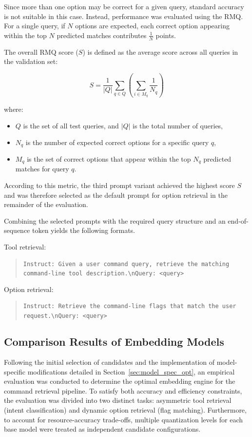 Since more than one option may be correct for a given query, standard accuracy is not suitable in this case. Instead, performance was evaluated using the \ac{RMQ}. For a single query, if $N$ options are expected, each correct option appearing within the top $N$ predicted matches contributes $\frac{1}{N}$ points.

The overall \ac{RMQ} score ($S$) is defined as the average score across all queries in the validation set:

$$S = \frac{1}{|Q|} \sum_{q \in Q} \left( \sum_{i \in M_q} \frac{1}{N_q} \right)$$

where:
\begin{itemize}
    \item $Q$ is the set of all test queries, and $|Q|$ is the total number of queries,
    \item $N_q$ is the number of expected correct options for a specific query $q$,
    \item $M_q$ is the set of correct options that appear within the top $N_q$ predicted matches for query $q$.
\end{itemize}

According to this metric, the third prompt variant achieved the highest score $S$ and was therefore selected as the default prompt for option retrieval in the remainder of the evaluation.

Combining the selected prompts with the required query structure and an end-of-sequence token yields the following formats.

Tool retrieval:

\begin{quote}
\texttt{Instruct: Given a user command query, retrieve the matching command-line tool description.\textbackslash nQuery: <query>}
\end{quote}

Option retrieval:

\begin{quote}
\texttt{Instruct: Retrieve the command-line flags that match the user request.\textbackslash nQuery: <query>}
\end{quote}



\subsection{Comparison Results of Embedding Models}\label{sec:comparison_results}

Following the initial selection of candidates and the implementation of model-specific modifications detailed in Section~\ref{sec:model_spec_opt}, an empirical evaluation was conducted to determine the optimal embedding engine for the command retrieval pipeline. To satisfy both accuracy and efficiency constraints, the evaluation was divided into two distinct tasks: asymmetric tool retrieval (intent classification) and dynamic option retrieval (flag matching). Furthermore, to account for resource-accuracy trade-offs, multiple quantization levels for each base model were treated as independent candidate configurations.

